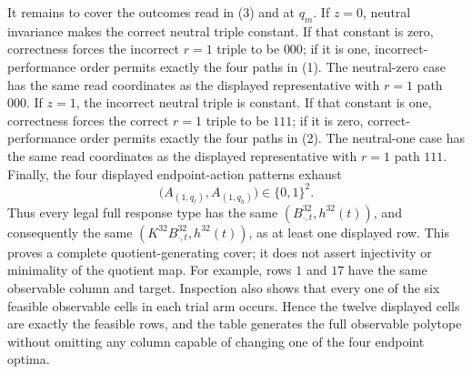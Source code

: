 It remains to cover the outcomes read in (3) and at \(q_m\).  If \(z=0\), neutral invariance makes the correct neutral triple constant.  If that constant is zero, correctness forces the incorrect \(r=1\) triple to be \(000\); if it is one, incorrect-performance order permits exactly the four paths in (1).  The neutral-zero case has the same read coordinates as the displayed representative with \(r=1\) path \(000\).  If \(z=1\), the incorrect neutral triple is constant.  If that constant is one, correctness forces the correct \(r=1\) triple to be \(111\); if it is zero, correct-performance order permits exactly the four paths in (2).  The neutral-one case has the same read coordinates as the displayed representative with \(r=1\) path \(111\).  Finally, the four displayed endpoint-action patterns exhaust
\[
\bigl(A_{(1,q_\ell)},A_{(1,q_h)}\bigr)\in\{0,1\}^2.
\tag{4}
\]
Thus every legal full response type has the same \((B^{32}_{\cdot,t},h^{32}(t))\), and consequently the same \((K^{32}B^{32}_{\cdot,t},h^{32}(t))\), as at least one displayed row.  This proves a complete quotient-generating cover; it does not assert injectivity or minimality of the quotient map.  For example, rows \(1\) and \(17\) have the same observable column and target.  Inspection also shows that every one of the six feasible observable cells in each trial arm occurs.  Hence the twelve displayed cells are exactly the feasible rows, and the table generates the full observable polytope without omitting any column capable of changing one of the four endpoint optima.


